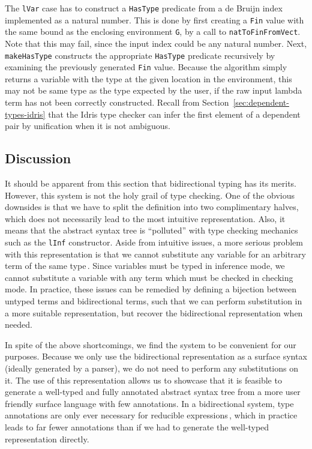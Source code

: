 The \texttt{lVar} case has to construct a \texttt{HasType} predicate from a de Bruijn index implemented as a natural number. This is done by first creating a \texttt{Fin} value with the same bound as the enclosing environment \texttt{G}, by a call to \texttt{natToFinFromVect}. Note that this may fail, since the input index could be any natural number. Next, \texttt{makeHasType} constructs the appropriate \texttt{HasType} predicate recursively by examining the previously generated \texttt{Fin} value. Because the algorithm simply returns a variable with the type at the given location in the environment, this may not be same type as the type expected by the user, if the raw input lambda term has not been correctly constructed. Recall from Section~\ref{sec:dependent-types-idris} that the Idris type checker can infer the first element of a dependent pair by unification when it is not ambiguous.

\subsection{Discussion}
It should be apparent from this section that bidirectional typing has its merits. However, this system is not the holy grail of type checking. One of the obvious downsides is that we have to split the definition into two complimentary halves, which does not necessarily lead to the most intuitive representation. Also, it means that the abstract syntax tree is ``polluted'' with type checking mechanics such as the \texttt{lInf} constructor. Aside from intuitive issues, a more serious problem with this representation is that we cannot substitute any variable for an arbitrary term of the same type\,\cite{Weirich:bidirectional}. Since variables must be typed in inference mode, we cannot substitute a variable with any term which must be checked in checking mode. In practice, these issues can be remedied by defining a bijection between untyped terms and bidirectional terms, such that we can perform substitution in a more suitable representation, but recover the bidirectional representation when needed.

In spite of the above shortcomings, we find the system to be convenient for our purposes. Because we only use the bidirectional representation as a surface syntax (ideally generated by a parser), we do not need to perform any substitutions on it. The use of this representation allows us to showcase that it is feasible to generate a well-typed and fully annotated abstract syntax tree from a more user friendly surface language with few annotations. In a bidirectional system, type annotations are only ever necessary for reducible expressions\,\cite{Dunfield13:bidir}, which in practice leads to far fewer annotations than if we had to generate the well-typed representation directly.


